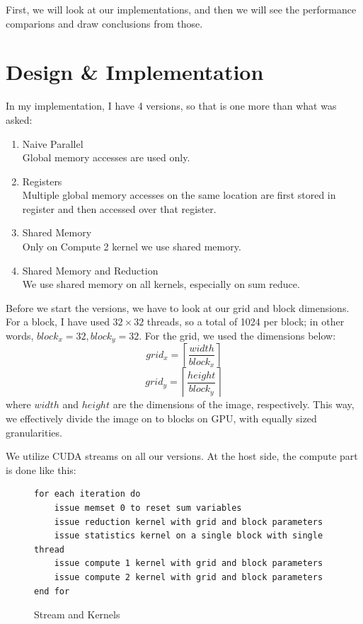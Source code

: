 \documentclass[12pt,reqno]{amsart}
\begin{document}
First, we will look at our implementations, and then we will see the performance comparions and draw conclusions from those.

\section{Design \& Implementation}

In my implementation, I have 4 versions, so that is one more than what was asked:
\begin{enumerate}
	\item Naive Parallel \\
	Global memory accesses are used only.
	\item Registers \\
	Multiple global memory accesses on the same location are first stored in register and then accessed over that register.
	\item Shared Memory \\
	Only on Compute 2 kernel we use shared memory.
	\item Shared Memory and Reduction \\
	We use shared memory on all kernels, especially on sum reduce.
\end{enumerate}

Before we start the versions, we have to look at our grid and block dimensions. For a block, I have used $32\times32$ threads, so a total of 1024 per block; in other words, $block_x = 32, block_y = 32$. For the grid, we used the dimensions below:
$$
grid_x = \left\lceil \frac{width}{block_x}\right\rceil
$$
$$
grid_y = \left\lceil \frac{height}{block_y}\right\rceil
$$
where $width$ and $height$ are the dimensions of the image, respectively. This way, we effectively divide the image on to blocks on GPU, with equally sized granularities.

We utilize CUDA streams on all our versions. At the host side, the compute part is done like this:
\begin{figure}[h]
\centering
\begin{lstlisting}
for each iteration do
    issue memset 0 to reset sum variables
    issue reduction kernel with grid and block parameters
    issue statistics kernel on a single block with single thread
    issue compute 1 kernel with grid and block parameters
    issue compute 2 kernel with grid and block parameters 
end for
\end{lstlisting}
\caption{Stream and Kernels}
\label{fig:hostloop}
\end{figure}
\end{document}
